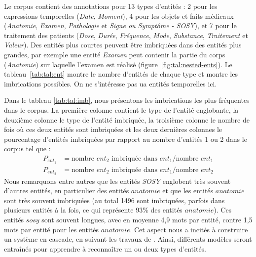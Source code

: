 Le corpus contient des annotations pour \num{13} types d'entités : \num{2} pour les expressions temporelles (\emph{Date}, \emph{Moment}), \num{4} pour les objets et faits médicaux (\emph{Anatomie}, \emph{Examen}, \emph{Pathologie} et \emph{Signe ou Symptôme - SOSY}), et \num{7} pour le traitement des patients (\emph{Dose}, \emph{Durée}, \emph{Fréquence}, \emph{Mode}, \emph{Substance}, \emph{Traitement} et \emph{Valeur}).
Des entités plus courtes peuvent être imbriquées dans des entités plus grandes, par exemple une entité \emph{Examen} peut contenir la partie du corps (\emph{Anatomie}) sur laquelle l'examen est réalisé (figure~\ref{fig:tal:nested-ents}).
Le tableau~\ref{tab:tal:ent} montre le nombre d'entités de chaque type et montre les imbrications possibles.
On ne s'intéresse pas ua entités temporelles ici.

Dans le tableau \ref{tab:tal:imb}, nous présentons les imbrications les plus fréquentes dans le corpus.
La première colonne contient le type de l'entité englobante, la deuxième colonne le type de l'entité imbriquée, la troisième colonne le nombre de fois où ces deux entités sont imbriquées et les deux dernières colonnes le pourcentage d'entités imbriquées par rapport au nombre d'entités 1 ou 2 dans le corpus tel que :
\begin{align*}
    P_{ent_1} & = \text{nombre } ent_2 \text{ imbriquée dans } ent_1 / \text{nombre } ent_1 \\
    P_{ent_2} & = \text{nombre } ent_2 \text{ imbriquée dans } ent_1 / \text{nombre } ent_2
\end{align*}
Nous remarquons entre autres que les entités \emph{SOSY} englobent très souvent d'autres entités, en particulier des entités $anatomie$ et que les entités $anatomie$ sont très souvent imbriquées (au total 1496 sont imbriquées, parfois dans plusieurs entités à la fois, ce qui représente 93\% des entités $anatomie$). Ces entités $sosy$ sont souvent longues, avec en moyenne 4,9 mots par entité, contre 1,5 mots par entité pour les entités $anatomie$.
Cet aspect nous a incités à construire un système en cascade, en suivant les travaux de \cite{alexRecognisingNestedNamed2007}. Ainsi, différents modèles seront entraînés pour apprendre à reconnaître un ou deux types d'entités.

